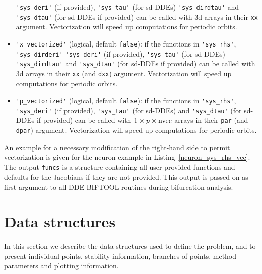 \documentclass[10pt]{scrartcl}
\newcommand{\DDEBIFCODE}{\textsc{DDE-BIFTOOL}}
\newcommand{\parm}[1]{\mathsf{#1}}
\newcommand{\define}[1]{\emph{#1}}
\newcommand{\blist}[1]{\mbox{\lstinline!#1!}}
\begin{document}
\begin{itemize}
  \blist{'sys_deri'} (if provided), \blist{'sys_tau'} (for sd-DDEs)
  \blist{'sys_dirdtau'} and \blist{'sys_dtau'} (for sd-DDEs if
  provided) can be called with $3$d arrays in their \blist{xx}
  argument. Vectorization will speed up computations for periodic
  orbits.
\item \blist{'x_vectorized'} (logical, default \blist{false}): if the
  functions in \blist{'sys_rhs'}, \blist{'sys_dirderi'}
  \blist{'sys_deri'} (if provided), \blist{'sys_tau'} (for sd-DDEs)
  \blist{'sys_dirdtau'} and \blist{'sys_dtau'} (for sd-DDEs if
  provided) can be called with $3$d arrays in their \blist{xx} (and
  \blist{dxx}) argument. Vectorization will speed up computations for
  periodic orbits.
\item \blist{'p_vectorized'} (logical, default \blist{false}): if the
  functions in \blist{'sys_rhs'}, \blist{'sys_deri'} (if provided),
  \blist{'sys_tau'} (for sd-DDEs) and \blist{'sys_dtau'} (for sd-DDEs
  if provided) can be called with $1\times p\times \blist{nvec}$
  arrays in their \blist{par} (and \blist{dpar})
  argument. Vectorization will speed up computations for periodic
  orbits.
\end{itemize}
An example for a necessary modification of the right-hand side to
permit vectorization is given for the neuron example in
Listing~\ref{neuron_sys_rhs_vec}. The output \blist{funcs} is a
structure containing all user-provided functions and defaults for the
Jacobians if they are not provided. This output is passed on as first
argument to all \DDEBIFCODE{} routines during bifurcation analysis.

\section{Data structures}\label{data_structures}

In this section we describe the data structures used to define the
problem, and to present individual points, stability information, branches
of points, method parameters and plotting information.

\end{document}
